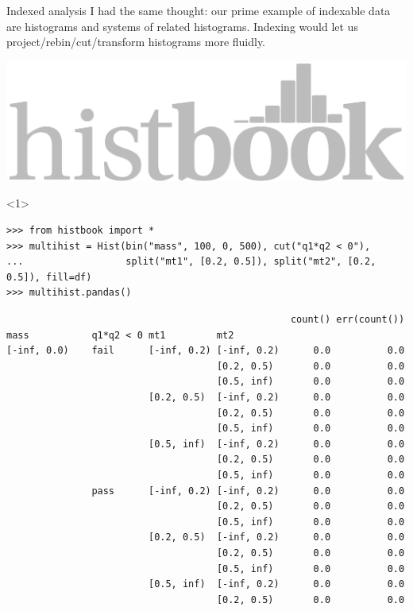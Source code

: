 \documentclass[aspectratio=169]{beamer}
\begin{document}
\begin{frame}[fragile]{Indexed analysis}
\large
\vspace{0.25 cm}
I had the same thought: our prime example of indexable data are histograms and systems of related histograms. Indexing would let us project/rebin/cut/transform histograms more fluidly.

\vspace{-0.5 cm}
\hfill \includegraphics[height=1 cm]{histbook-logo.pdf}

\vspace{-0.5 cm}
\vspace{0.25 cm}
\begin{onlyenv}<1>
\scriptsize
\begin{verbatim}
>>> from histbook import *
>>> multihist = Hist(bin("mass", 100, 0, 500), cut("q1*q2 < 0"),
...                  split("mt1", [0.2, 0.5]), split("mt2", [0.2, 0.5]), fill=df)
>>> multihist.pandas()
\end{verbatim}
\tiny
\vspace{-0.25 cm}
\begin{verbatim}
                                                  count() err(count())
mass           q1*q2 < 0 mt1         mt2
[-inf, 0.0)    fail      [-inf, 0.2) [-inf, 0.2)      0.0          0.0
                                     [0.2, 0.5)       0.0          0.0
                                     [0.5, inf)       0.0          0.0
                         [0.2, 0.5)  [-inf, 0.2)      0.0          0.0
                                     [0.2, 0.5)       0.0          0.0
                                     [0.5, inf)       0.0          0.0
                         [0.5, inf)  [-inf, 0.2)      0.0          0.0
                                     [0.2, 0.5)       0.0          0.0
                                     [0.5, inf)       0.0          0.0
               pass      [-inf, 0.2) [-inf, 0.2)      0.0          0.0
                                     [0.2, 0.5)       0.0          0.0
                                     [0.5, inf)       0.0          0.0
                         [0.2, 0.5)  [-inf, 0.2)      0.0          0.0
                                     [0.2, 0.5)       0.0          0.0
                                     [0.5, inf)       0.0          0.0
                         [0.5, inf)  [-inf, 0.2)      0.0          0.0
                                     [0.2, 0.5)       0.0          0.0

\end{verbatim}
\end{onlyenv}
\end{frame}
\end{document}
